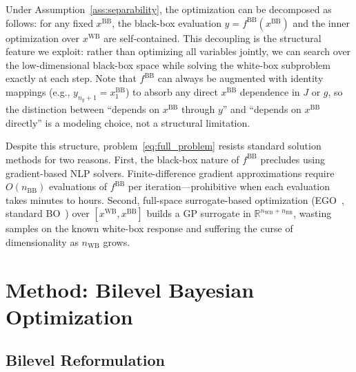 \documentclass[12pt,a4paper]{article}%
\theoremstyle{plain}%
\theoremstyle{remark}%
\theoremstyle{definition}%
\def\WB{\mathrm{WB}}
\def\BB{\mathrm{BB}}
\begin{document}
Under Assumption~\ref{ass:separability}, the optimization can be decomposed as follows: for any fixed $x^{\BB}$, the black-box evaluation $y = f^{\BB}(x^{\BB})$ and the inner optimization over $x^{\WB}$ are self-contained. This decoupling is the structural feature we exploit: rather than optimizing all variables jointly, we can search over the low-dimensional black-box space while solving the white-box subproblem exactly at each step. Note that $f^{\BB}$ can always be augmented with identity mappings (e.g., $y_{n_y+1} = x^{\BB}_1$) to absorb any direct $x^{\BB}$ dependence in $J$ or $g$, so the distinction between ``depends on $x^{\BB}$ through $y$'' and ``depends on $x^{\BB}$ directly'' is a modeling choice, not a structural limitation.

Despite this structure, problem~\eqref{eq:full_problem} resists standard solution methods for two reasons. First, the black-box nature of $f^{\BB}$ precludes using gradient-based NLP solvers. Finite-difference gradient approximations require $O(n_{\BB})$ evaluations of $f^{\BB}$ per iteration---prohibitive when each evaluation takes minutes to hours. Second, full-space surrogate-based optimization (EGO~\cite{jones1998efficient}, standard BO~\cite{frazier2018tutorial}) over $[x^{\WB}, x^{\BB}]$ builds a GP surrogate in $\mathbb{R}^{n_{\WB}+n_{\BB}}$, wasting samples on the known white-box response and suffering the curse of dimensionality as $n_{\WB}$ grows.

\section{Method: Bilevel Bayesian Optimization}\label{sec:method}

\subsection{Bilevel Reformulation}\label{subsec:bilevel_reformulation}
\end{document}

